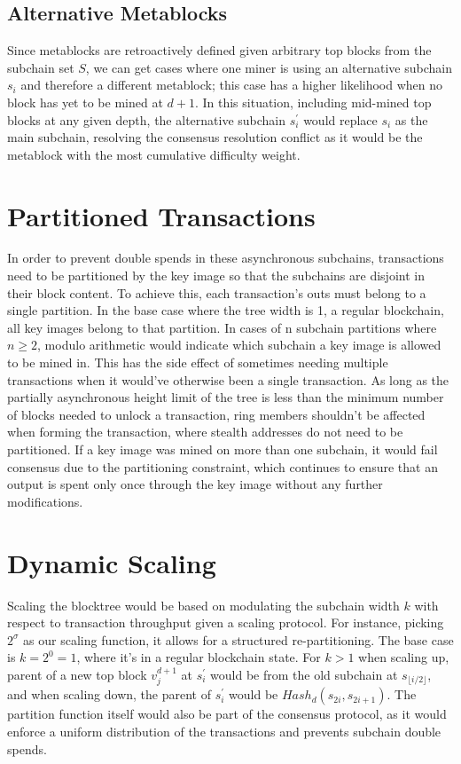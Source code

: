 \documentclass{article}
\begin{document}
\subsection{Alternative Metablocks}
Since metablocks are retroactively defined given arbitrary top blocks from the subchain set $S$, we can get cases where one miner is using an alternative subchain $s_i$ and therefore a different metablock; this case has a higher likelihood when no block has yet to be mined at $d+1$. In this situation, including mid-mined top blocks at any given depth, the alternative subchain $s_i^\prime$ would replace $s_i$ as the main subchain, resolving the consensus resolution conflict as it would be the metablock with the most cumulative difficulty weight.
\section{Partitioned Transactions}
In order to prevent double spends in these asynchronous subchains, transactions need to be partitioned by the key image so that the subchains are disjoint in their block content. To achieve this, each transaction's outs must belong to a single partition. In the base case where the tree width is 1, a regular blockchain, all key images belong to that partition. In cases of n subchain partitions where $n \geq 2$, modulo arithmetic would indicate which subchain a key image is allowed to be mined in. This has the side effect of sometimes needing multiple transactions when it would've otherwise been a single transaction. As long as the partially asynchronous height limit of the tree is less than the minimum number of blocks needed to unlock a transaction, ring members shouldn't be affected when forming the transaction, where stealth addresses do not need to be partitioned. If a key image was mined on more than one subchain, it would fail consensus due to the partitioning constraint, which continues to ensure that an output is spent only once through the key image without any further modifications.
\section{Dynamic Scaling}
Scaling the blocktree would be based on modulating the subchain width $k$ with respect to transaction throughput given a scaling protocol. For instance, picking $2^\sigma$ as our scaling function, it allows for a structured re-partitioning. The base case is $k = 2^0 = 1$, where it's in a regular blockchain state. For $k > 1$ when scaling up, parent of a new top block $v_j^{d+1}$ at $s_i^\prime$ would be from the old subchain at $s_{\lfloor i / 2\rfloor}$, and when scaling down, the parent of $s_i^\prime$ would be $Hash_d(s_{2i}, s_{2i + 1})$. The partition function itself would also be part of the consensus protocol, as it would enforce a uniform distribution of the transactions and prevents subchain double spends.
\end{document}
